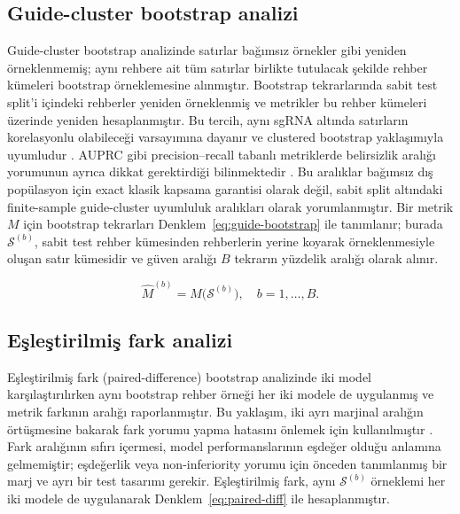\subsection{Guide-cluster bootstrap analizi}

Guide-cluster bootstrap analizinde satırlar bağımsız örnekler gibi yeniden örneklenmemiş; aynı rehbere ait tüm satırlar birlikte tutulacak şekilde rehber kümeleri bootstrap örneklemesine alınmıştır. Bootstrap tekrarlarında sabit test split'i içindeki rehberler yeniden örneklenmiş ve metrikler bu rehber kümeleri üzerinde yeniden hesaplanmıştır. Bu tercih, aynı sgRNA altında satırların korelasyonlu olabileceği varsayımına dayanır ve clustered bootstrap yaklaşımıyla uyumludur . AUPRC gibi precision--recall tabanlı metriklerde belirsizlik aralığı yorumunun ayrıca dikkat gerektirdiği bilinmektedir . Bu aralıklar bağımsız dış popülasyon için exact klasik kapsama garantisi olarak değil, sabit split altındaki finite-sample guide-cluster uyumluluk aralıkları olarak yorumlanmıştır. Bir metrik \(M\) için bootstrap tekrarları Denklem~\ref{eq:guide-bootstrap} ile tanımlanır; burada \(\mathcal{S}^{(b)}\), sabit test rehber kümesinden rehberlerin yerine koyarak örneklenmesiyle oluşan satır kümesidir ve güven aralığı \(B\) tekrarın yüzdelik aralığı olarak alınır.

\begin{equation}
\hat{M}^{(b)} = M\big(\mathcal{S}^{(b)}\big), \quad b = 1,\dots,B.
\label{eq:guide-bootstrap}
\end{equation}

\subsection{Eşleştirilmiş fark analizi}

Eşleştirilmiş fark (paired-difference) bootstrap analizinde iki model karşılaştırılırken aynı bootstrap rehber örneği her iki modele de uygulanmış ve metrik farkının aralığı raporlanmıştır. Bu yaklaşım, iki ayrı marjinal aralığın örtüşmesine bakarak fark yorumu yapma hatasını önlemek için kullanılmıştır . Fark aralığının sıfırı içermesi, model performanslarının eşdeğer olduğu anlamına gelmemiştir; eşdeğerlik veya non-inferiority yorumu için önceden tanımlanmış bir marj ve ayrı bir test tasarımı gerekir. Eşleştirilmiş fark, aynı \(\mathcal{S}^{(b)}\) örneklemi her iki modele de uygulanarak Denklem~\ref{eq:paired-diff} ile hesaplanmıştır.

